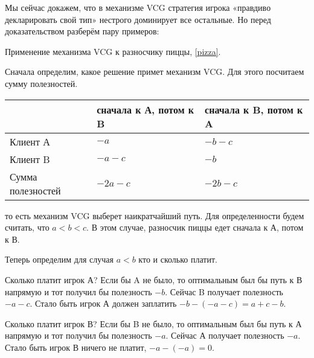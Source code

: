 Мы сейчас докажем, что в механизме VCG стратегия игрока «правдиво декларировать свой тип» нестрого доминирует все остальные. Но перед доказательством разберём пару примеров:

\begin{myex}
Применение механизма VCG к разносчику пиццы, \ref{pizza}.

Сначала определим, какое решение примет механизм VCG. Для этого посчитаем сумму полезностей.

\begin{tabular}{p{3 cm}|p{3 cm}p{3 cm}}
& сначала к А, потом к B & сначала к B, потом к A \\
\hline
Клиент А & $-a$ & $-b-c$ \\
Клиент B & $-a-c$ & $-b$ \\
Сумма полезностей& $-2a-c$ & $-2b-c$ \\
\end{tabular}

то есть механизм VCG выберет наикратчайший путь. Для определенности будем считать, что $ a<b<c $. В этом случае, разносчик пиццы едет сначала к А, потом к В.

Теперь определим для случая $ a<b $ кто и сколько платит.

Сколько платит игрок А? Если бы A не было, то оптимальным был бы путь к В напрямую и тот получил бы полезность $ -b $. Сейчас B получает полезность $ -a-c $. Стало быть игрок А должен заплатить $ -b-(-a-c)=a+c-b $.

Сколько платит игрок В? Если бы B не было, то оптимальным был бы путь к А напрямую и тот получил бы полезность $ -a $. Сейчас А получает полезность $ -a $. Стало быть игрок В ничего не платит, $ -a-(-a)=0 $.
\end{myex}


